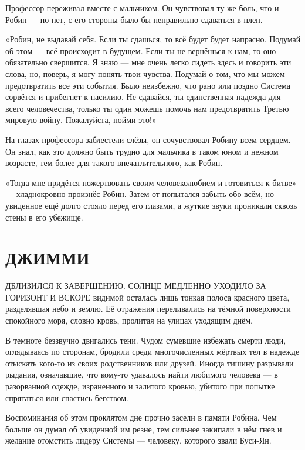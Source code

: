 \documentclass[a5paper, 9pt,
final, openany, twoside=true]{memoir}
\begin{document}
Профессор переживал вместе с мальчиком. Он чувствовал ту же боль, что и Робин — но нет, с его стороны было бы неправильно сдаваться в плен.

«Робин, не выдавай себя. Если ты сдашься, то всё будет будет напрасно. Подумай об этом — всё происходит в будущем. Если ты не вернёшься к нам, то оно обязательно свершится. Я знаю — мне очень легко сидеть здесь и говорить эти слова, но, поверь, я могу понять твои чувства. Подумай о том, что мы можем предотвратить все эти события. Было неизбежно, что рано или поздно Система сорвётся и прибегнет к насилию. Не сдавайся, ты единственная надежда для всего человечества, только ты один можешь помочь нам предотвратить Третью мировую войну. Пожалуйста, пойми это!»

На глазах профессора заблестели слёзы, он сочувствовал Робину всем сердцем. Он знал, как это должно быть трудно для мальчика в таком юном и нежном возрасте, тем более для такого впечатлительного, как Робин.\bigskip

«Тогда мне придётся пожертвовать своим человеколюбием и готовиться к битве» — хладнокровно произнёс Робин. Затем от попытался забыть обо всём, но увиденное ещё долго стояло перед его глазами, а жуткие звуки проникали сквозь стены в его убежище.

\chapter{ДЖИММИ}
Д{ БЛИЗИЛСЯ К ЗАВЕРШЕНИЮ. СОЛНЦЕ МЕДЛЕННО УХОДИЛО ЗА ГОРИЗОНТ И ВСКОРЕ} видимой осталась лишь тонкая полоса красного цвета, разделявшая небо и землю. Её отражения переливались на тёмной поверхности спокойного моря, словно кровь, пролитая на улицах уходящим днём.

В темноте беззвучно двигались тени. Чудом сумевшие избежать смерти люди, оглядываясь по сторонам, бродили среди многочисленных мёртвых тел в надежде отыскать кого-то из своих родственников или друзей. Иногда тишину разрывали рыдания, означавшие, что кому-то удавалось найти любимого человека — в разорванной одежде, израненного и залитого кровью, убитого при попытке спрятаться или спастись бегством.

Воспоминания об этом проклятом дне прочно засели в памяти Робина. Чем больше он думал об увиденной им резне, тем сильнее закипали в нём гнев и желание отомстить лидеру Системы — человеку, которого звали Буси-Ян.
\end{document}
